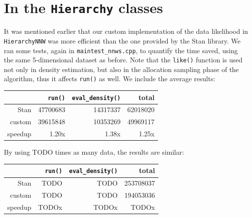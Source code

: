 \section{In the \texttt{Hierarchy} classes}
It was mentioned earlier that our custom implementation of the data likelihood in \verb|HierarchyNNW| was more efficient than the one provided by the Stan library.
We ran some tests, again in \verb|maintest_nnws.cpp|, to quantify the time saved, using the same 5-dimensional dataset as before.
Note that the \verb|like()| function is used not only in density estimation, but also in the allocation sampling phase of the algorithm, thus it affects \verb|run()| as well.
We include the average results:
\begin{center}
	\begin{tabular}{r|r|r|r}
		& \verb|run()| & \verb|eval_density()| & total \\ \hline
		   Stan & 47700683 & 14317337 & 62018020 \\
		 custom & 39615848 & 10353269 & 49969117 \\
		speedup &    1.20x &    1.38x &    1.25x
	\end{tabular}
\end{center}
By using TODO times as many data, the results are similar:
\begin{center}
	\begin{tabular}{r|r|r|r}
		& \verb|run()| & \verb|eval_density()| & total \\ \hline
		   Stan & TODO & TODO & 253708037 \\
		 custom & TODO & TODO & 194053036 \\
		speedup &     TODOx &    TODOx &     TODOx
	\end{tabular}
\end{center}



